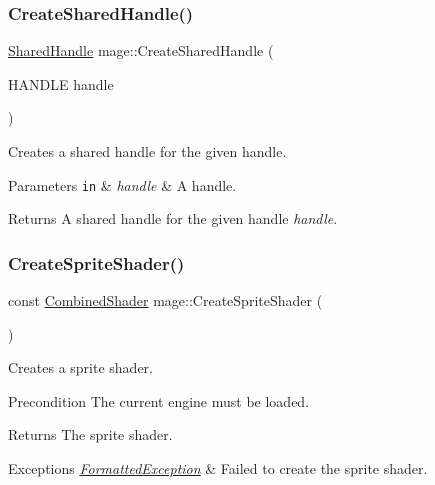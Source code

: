 \subsubsection{\texorpdfstring{Create\+Shared\+Handle()}{CreateSharedHandle()}}
{\footnotesize\ttfamily \hyperlink{namespacemage_ab892828913d6129acf71e0cec60467e5}{Shared\+Handle} mage\+::\+Create\+Shared\+Handle (\begin{DoxyParamCaption}\item[{H\+A\+N\+D\+LE}]{handle }\end{DoxyParamCaption})}

Creates a shared handle for the given handle.


\begin{DoxyParams}[1]{Parameters}
\mbox{\tt in}  & {\em handle} & A handle. \\
\hline
\end{DoxyParams}
\begin{DoxyReturn}{Returns}
A shared handle for the given handle {\itshape handle}. 
\end{DoxyReturn}
\hypertarget{namespacemage_a83cda7dcb5f25de3e5564aac5c0efa08}{}\label{namespacemage_a83cda7dcb5f25de3e5564aac5c0efa08} 
\subsubsection{\texorpdfstring{Create\+Sprite\+Shader()}{CreateSpriteShader()}}
{\footnotesize\ttfamily const \hyperlink{structmage_1_1_combined_shader}{Combined\+Shader} mage\+::\+Create\+Sprite\+Shader (\begin{DoxyParamCaption}{ }\end{DoxyParamCaption})}

Creates a sprite shader.

\begin{DoxyPrecond}{Precondition}
The current engine must be loaded. 
\end{DoxyPrecond}
\begin{DoxyReturn}{Returns}
The sprite shader. 
\end{DoxyReturn}

\begin{DoxyExceptions}{Exceptions}
{\em \hyperlink{structmage_1_1_formatted_exception}{Formatted\+Exception}} & Failed to create the sprite shader. \\
\hline
\end{DoxyExceptions}
\hypertarget{namespacemage_a6d7b762686800ea46b6f56dbfa0727a2}{}\label{namespacemage_a6d7b762686800ea46b6f56dbfa0727a2} 
